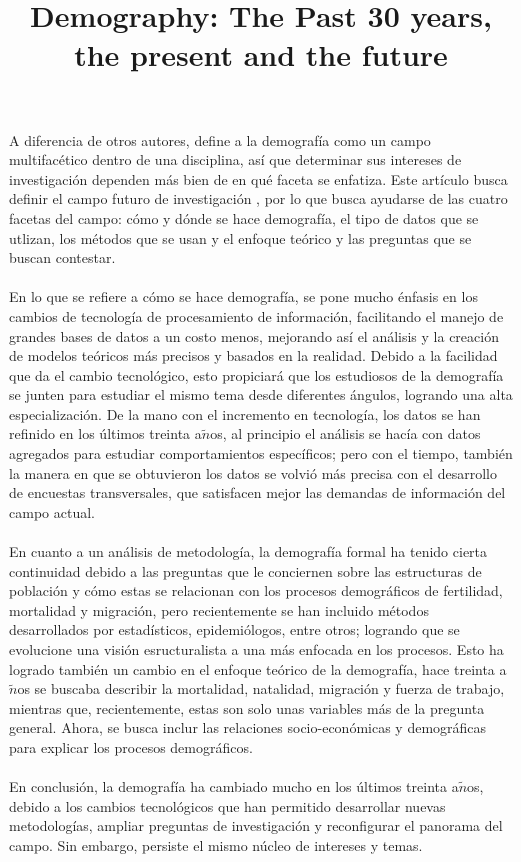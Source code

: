 \documentclass[11pt,spanish,letterpaper]{article}
\theoremstyle{plain}
\begin{document}
\title{Demography: The Past 30 years, the present and the future}
\date{}
\maketitle
A diferencia de otros autores, \cite{crimmins1993demography} define a la demograf\'ia como un campo multifac\'etico dentro de una disciplina, as\'i que determinar sus intereses de investigaci\'on dependen m\'as bien de en qu\'e faceta se enfatiza. Este art\'iculo busca definir el campo futuro de investigaci\'on , por lo que busca ayudarse de las cuatro facetas del campo: c\'omo y d\'onde se hace demograf\'ia, el tipo de datos que se utlizan, los m\'etodos que se usan y el enfoque te\'orico y las preguntas que se buscan contestar.\\
\\
En lo que se refiere a c\'omo se hace demograf\'ia, se pone mucho \'enfasis en los cambios de tecnolog\'ia de procesamiento de informaci\'on, facilitando el manejo de grandes bases de datos a un costo menos, mejorando as\'i el an\'alisis y la creaci\'on de modelos te\'oricos m\'as precisos y basados en la realidad. Debido a la facilidad que da el cambio tecnol\'ogico, esto propiciar\'a que los estudiosos de la demograf\'ia se junten para estudiar el mismo tema desde diferentes \'angulos, logrando una alta especializaci\'on. De la mano con el incremento en tecnolog\'ia, los datos se han refinido en los \'ultimos treinta a$\tilde{n}$os, al principio el an\'alisis se hac\'ia con datos agregados para estudiar comportamientos espec\'ificos; pero con el tiempo, tambi\'en la manera en que se obtuvieron los datos se volvi\'o m\'as precisa con el desarrollo de encuestas transversales, que satisfacen mejor las demandas de informaci\'on del campo actual.\\
\\
En cuanto a un an\'alisis de metodolog\'ia, la demograf\'ia formal ha tenido cierta continuidad debido a las preguntas que le conciernen sobre las estructuras de poblaci\'on y c\'omo estas se relacionan con los procesos demogr\'aficos de fertilidad, mortalidad y migraci\'on, pero recientemente se han incluido m\'etodos desarrollados por estad\'isticos, epidemi\'ologos, entre otros; logrando que se evolucione una visi\'on esructuralista a una m\'as enfocada en los procesos. Esto ha logrado tambi\'en un cambio en el enfoque te\'orico de la demograf\'ia, hace treinta a$\tilde{n}$os se buscaba describir la mortalidad, natalidad, migraci\'on y fuerza de trabajo, mientras que, recientemente, estas son solo unas variables m\'as de la pregunta general. Ahora, se busca inclur las relaciones socio-econ\'omicas y demogr\'aficas para explicar los procesos demogr\'aficos.\\
\\
En conclusi\'on, la demograf\'ia ha cambiado mucho en los \'ultimos treinta a$\tilde{n}$os, debido a los cambios tecnol\'ogicos que han permitido desarrollar nuevas metodolog\'ias, ampliar preguntas de investigaci\'on y reconfigurar el panorama del campo. Sin embargo, persiste el mismo n\'ucleo de intereses y temas.


\end{document}
